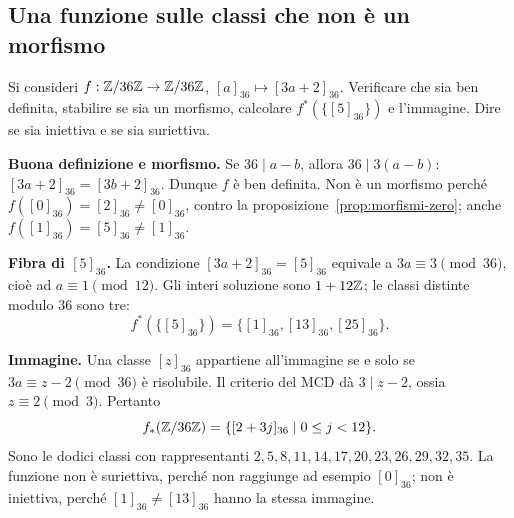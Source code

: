 \subsection{Una funzione sulle classi che non è un morfismo}
\begin{esercizio}
Si consideri $f:\mathbb{Z}/36\mathbb{Z}\to\mathbb{Z}/36\mathbb{Z}$, $[a]_{36}\mapsto[3a+2]_{36}$. Verificare che sia ben definita, stabilire se sia un morfismo, calcolare $f^*(\{[5]_{36}\})$ e l'immagine. Dire se sia iniettiva e se sia suriettiva.
\end{esercizio}
\begin{svolgimento}
\textbf{Buona definizione e morfismo.} Se $36\mid a-b$, allora $36\mid3(a-b)$: $[3a+2]_{36}=[3b+2]_{36}$. Dunque $f$ è ben definita. Non è un morfismo perché $f([0]_{36})=[2]_{36}\ne[0]_{36}$, contro la proposizione~\ref{prop:morfismi-zero}; anche $f([1]_{36})=[5]_{36}\ne[1]_{36}$.

\textbf{Fibra di $[5]_{36}$.} La condizione $[3a+2]_{36}=[5]_{36}$ equivale a $3a\equiv3\pmod{36}$, cioè ad $a\equiv1\pmod{12}$. Gli interi soluzione sono $1+12\mathbb{Z}$; le classi distinte modulo $36$ sono tre:
\[
f^*(\{[5]_{36}\})=\{[1]_{36},[13]_{36},[25]_{36}\}.
\]

\textbf{Immagine.} Una classe $[z]_{36}$ appartiene all'immagine se e solo se $3a\equiv z-2\pmod{36}$ è risolubile. Il criterio del MCD dà $3\mid z-2$, ossia $z\equiv2\pmod3$. Pertanto
\[
f_*(\mathbb{Z}/36\mathbb{Z})=\{[2+3j]_{36}\mid 0\le j<12\}.
\]
Sono le dodici classi con rappresentanti $2,5,8,11,14,17,20,23,26,29,32,35$. La funzione non è suriettiva, perché non raggiunge ad esempio $[0]_{36}$; non è iniettiva, perché $[1]_{36}\ne[13]_{36}$ hanno la stessa immagine.
\end{svolgimento}
